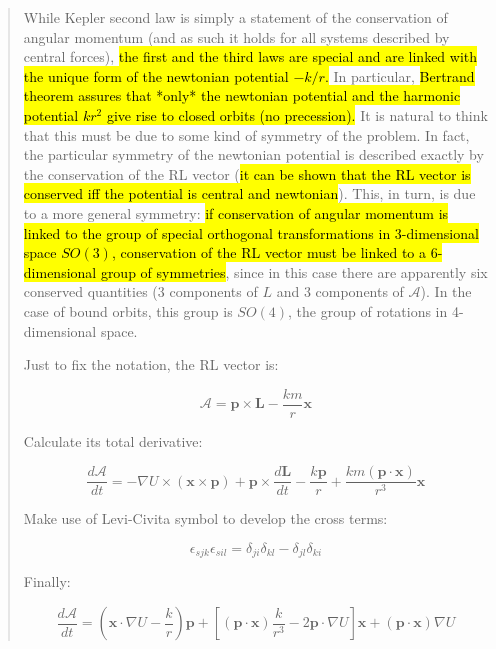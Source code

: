     \begin{quote}
        While Kepler second law is simply a statement of the conservation of angular momentum (and as such it holds for all systems described by central forces), \hl{the first and the third laws are special and are linked with the unique form of the newtonian potential $-k/r$.} In particular, \hl{Bertrand theorem assures that *only* the newtonian potential and the harmonic potential $kr^2$ give rise to closed orbits (no precession).} It is natural to think that this must be due to some kind of symmetry of the problem. In fact, the particular symmetry of the newtonian potential is described exactly by the conservation of the RL vector (\hl{it can be shown that the RL vector is conserved iff the potential is central and newtonian}). This, in turn, is due to a more general symmetry: \hl{if conservation of angular momentum is linked to the group of special orthogonal transformations in 3-dimensional space $SO(3)$, conservation of the RL vector must be linked to a 6-dimensional group of symmetries}, since in this case there are apparently six conserved quantities (3 components of $L$ and 3 components of $\mathcal A$). In the case of bound orbits, this group is $SO(4)$, the group of rotations in 4-dimensional space.  

        Just to fix the notation, the RL vector is:

        \begin{equation} \mathcal{A}=\textbf{p}\times\textbf{L}-\frac{km}{r}\textbf{x} \end{equation}

        Calculate its total derivative:

        \begin{equation}\frac{d\mathcal{A}}{dt}=-\nabla U\times(\textbf{x}\times\textbf{p})+\textbf{p}\times\frac{d\textbf{L}}{dt}-\frac{k\textbf{p}}{r}+\frac{km(\textbf{p}\cdot \textbf{x})}{r^3}\textbf{x} \end{equation}

        Make use of Levi-Civita symbol to develop the cross terms:

        \begin{equation}\epsilon_{sjk}\epsilon_{sil}=\delta_{ji}\delta_{kl}-\delta_{jl}\delta_{ki}   \end{equation}

        Finally:

        \begin{equation}
        \frac{d\mathcal{A}}{dt}=\left(\textbf{x}\cdot\nabla U-\frac{k}{r}\right)\textbf{p}+\left[(\textbf{p}\cdot\textbf{x})\frac{k}{r^3}-2\textbf{p}\cdot\nabla U\right]\textbf{x}+(\textbf{p}\cdot\textbf{x})\nabla U
        \end{equation}


\end{quote}
